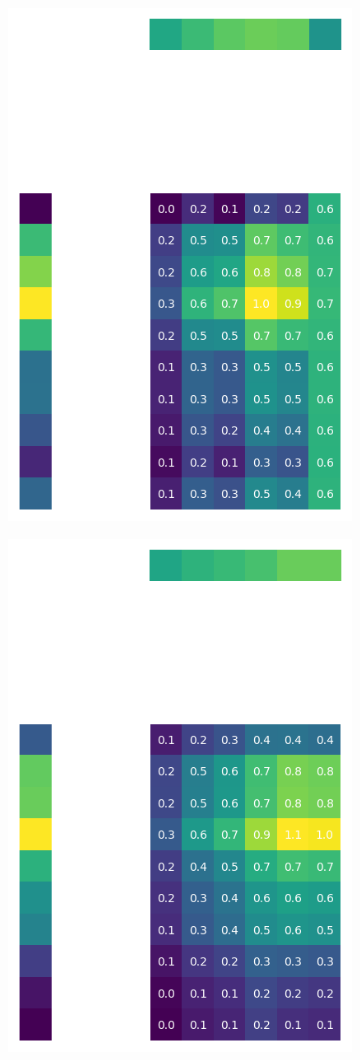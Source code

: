 \documentclass[10pt,twocolumn]{article}
\begin{document}
\begin{figure}[H]
\begin{subfigure}[t]{.15\textwidth}
\includegraphics[scale=.2]{DWGs/semi-structured-matrix-reconstruction-PCs-1.png}
\caption{ }
\end{subfigure}
\begin{subfigure}[t]{.15\textwidth}
\centering
\includegraphics[scale=.2]{DWGs/structured-matrix-reconstruction-PCs-1.png}

\end{subfigure}
\end{figure}
\end{document}
